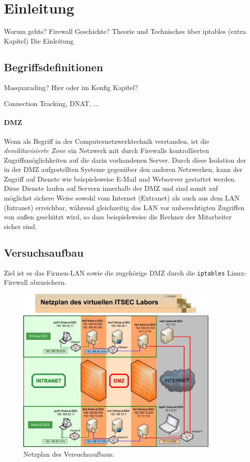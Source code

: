 \section{Einleitung}

Worum gehts? Firewall Geschichte? Theorie und Technisches über iptables (extra Kapitel)
Die Einleitung \cite{iptables}


\subsection{Begriffsdefinitionen}

Masquarading? Hier oder im Konfig Kapitel?

Connection Tracking, DNAT, ...

\paragraph{DMZ}
Wenn als Begriff in der Computernetzwerktechnik verstanden, ist die
\emph{demilitarisierte Zone} ein Netzwerk mit durch Firewalls
kontrollierten Zugriffs\-mög\-lich\-keiten auf die darin vorhandenen Server.
Durch diese Isolation der in der DMZ aufgestellten Systeme gegenüber den anderen
Netzwerken, kann der Zugriff auf Dienste wie beispielsweise E-Mail und Webserver
gestattet werden.
Diese Dienste laufen auf Servern innerhalb der DMZ und sind somit auf möglichst
sichere Weise sowohl vom Internet (Extranet) als auch aus dem LAN (Intranet)
erreichbar,
während gleichzeitig das LAN vor unberechtigten Zugriffen von außen geschützt
wird, so dass beispielsweise die Rechner der Mitarbeiter sicher sind.


\subsection{Versuchsaufbau}

Ziel ist es das Firmen-LAN sowie die zugehörige DMZ durch die
{\tt iptables} Linux-Firewall abzusichern.

\begin{figure}[h!]
  \centering
    \includegraphics[width=0.9\textwidth]{figures/Netzplan.jpg}
  \caption{Netzplan des Versuchsaufbaus.\cite{labor}}
  \label{fig.netzplan}
\end{figure}

